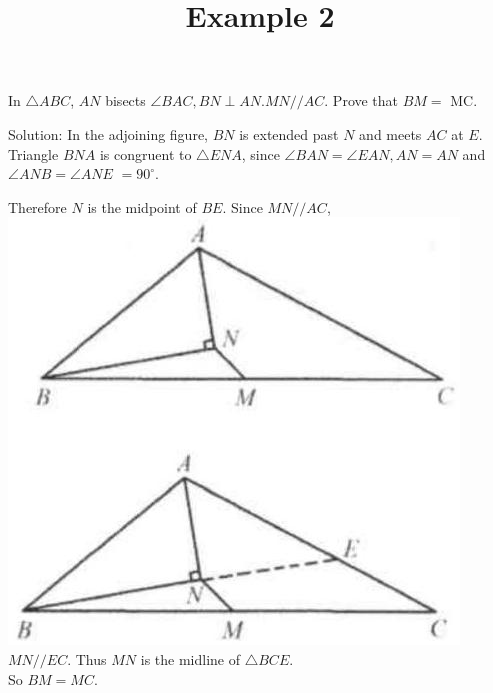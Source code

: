 \documentclass{article}
\title{Example 2}
\date{}
\begin{document}
\maketitle

In \(\triangle A B C\), \(A N\) bisects \(\angle B A C, B N \perp A N . M N / / A C\). Prove that \(B M=\) MC.

Solution:
In the adjoining figure, \(B N\) is extended past \(N\) and meets \(A C\) at \(E\). Triangle \(B N A\) is congruent to \(\triangle E N A\), since \(\angle B A N=\angle E A N, A N=A N\) and \(\angle A N B=\angle A N E\) \(=90^{\circ}\).

Therefore \(N\) is the midpoint of \(B E\). Since \(M N / / A C\),\\
\includegraphics[width=\textwidth]{images/055(1).jpg} \(M N / / E C\). Thus \(M N\) is the midline of \(\triangle B C E\).\\
So \(B M=M C\).
\end{document}
